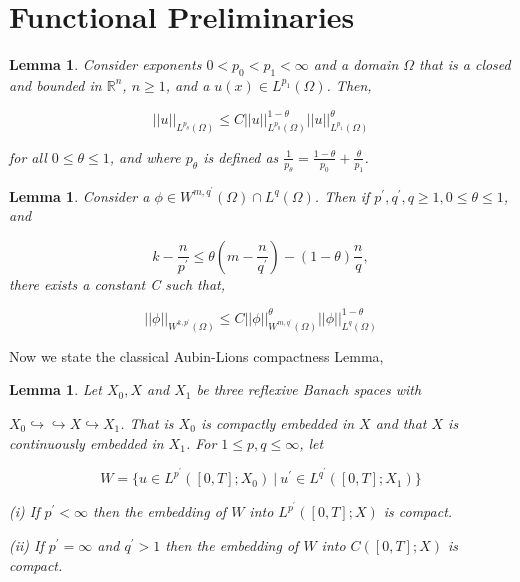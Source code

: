\documentclass[10pt]{amsart}
\theoremstyle{plain}
\newtheorem{lemma}[theorem]{Lemma}
\theoremstyle{definition}
\begin{document}



\appendix

\section{Functional Preliminaries}

\begin{lemma}
\label{lem:wlp}
Consider exponents $0 < p_0 < p_1 < \infty$ and a domain $\Omega$ that is a closed and bounded in $\mathbb{R}^{n}$, $n\geq 1$, and a $u(x) \in L^{p_1}(\Omega)$. Then,

\begin{equation}
||u||_{L^{p_{\theta}}(\Omega)} \leq C||u||^{1-\theta}_{L^{p_{0}}(\Omega)} ||u||^{\theta}_{L^{p_{1}}(\Omega)}
\end{equation}

for all $0 \leq \theta \leq 1$, and where $p_{\theta}$ is defined as $\frac{1}{p_{\theta}} = \frac{1-\theta}{p_0} + \frac{\theta}{p_1}$.
\end{lemma}



\begin{lemma}
\label{lem:gns}
Consider a $\phi \in W^{m,q^{'}}(\Omega) \cap L^{q}(\Omega)$. Then if $p^{'}, q^{'}, q \geq 1, 0 \leq \theta \leq 1$, and

\begin{equation}
k - \frac{n}{p^{'}} \leq \theta \left(  m - \frac{n}{q^{'}} \right) - (1 - \theta) \frac{n}{q},
\end{equation}
there exists a constant C such that,


\begin{equation}
	||\phi||_{W^{k,p^{'}}(\Omega)} \leq C ||\phi||^{\theta}_{W^{m,q^{'}}(\Omega)} ||\phi||^{1 - \theta}_{L^{q}(\Omega)} 
	\end{equation}

\end{lemma}	

Now we state the classical Aubin-Lions compactness Lemma,

\begin{lemma}
\label{lem:al}
Let $X_0, X$ and $X_1$ be three reflexive Banach spaces with 

$X_0 \hookrightarrow \hookrightarrow X \hookrightarrow X_1$. That is $ X_0$ is compactly embedded in $X$ and that $X$ is continuously embedded in $X_1$. For $1\leq p,q \leq \infty$, let

 \begin{equation}
W = \{ u \in L^{p^{'}}([0,T];X_0) \ | \  u^{'} \in L^{q^{'}}([0,T];X_1)  \}
\end{equation}

(i) If $p^{'} < \infty$ then the embedding of $W$ into $L^{p^{'}}([0,T];X)$ is compact.

(ii) If $p^{'} = \infty$ and $q^{'} > 1$ then the embedding of $W$ into $C([0,T];X)$ is compact.
\end{lemma}
\end{document}
